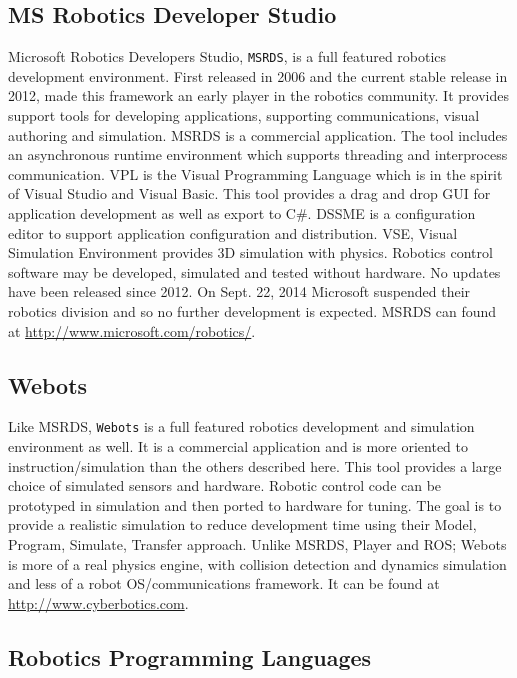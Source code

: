 \hypertarget{ms-robotics-developer-studio}{%
\subsection{MS Robotics Developer
Studio}\label{ms-robotics-developer-studio}}

Microsoft Robotics Developers Studio, \texttt{MSRDS}, is a full featured
robotics development environment. First released in 2006 and the current
stable release in 2012, made this framework an early player in the
robotics community. It provides support tools for developing
applications, supporting communications, visual authoring and
simulation. MSRDS is a commercial application. The tool includes an
asynchronous runtime environment which supports threading and
interprocess communication. VPL is the Visual Programming Language which
is in the spirit of Visual Studio and Visual Basic. This tool provides a
drag and drop GUI for application development as well as export to C\#.
DSSME is a configuration editor to support application configuration and
distribution. VSE, Visual Simulation Environment provides 3D simulation
with physics. Robotics control software may be developed, simulated and
tested without hardware. No updates have been released since 2012. On
Sept. 22, 2014 Microsoft suspended their robotics division and so no
further development is expected. MSRDS can found at
\url{http://www.microsoft.com/robotics/}.

\hypertarget{webots}{%
\subsection{Webots}\label{webots}}

Like MSRDS, \texttt{Webots} is a full featured robotics development and
simulation environment as well. It is a commercial application and is
more oriented to instruction/simulation than the others described here.
This tool provides a large choice of simulated sensors and hardware.
Robotic control code can be prototyped in simulation and then ported to
hardware for tuning. The goal is to provide a realistic simulation to
reduce development time using their Model, Program, Simulate, Transfer
approach. Unlike MSRDS, Player and ROS; Webots is more of a real physics
engine, with collision detection and dynamics simulation and less of a
robot OS/communications framework. It can be found at
\url{http://www.cyberbotics.com}.

\hypertarget{robotics-programming-languages}{%
\subsection{Robotics Programming
Languages}\label{robotics-programming-languages}}

